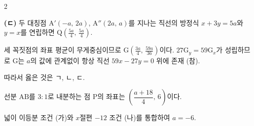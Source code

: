 \documentclass[10pt,fleqn]{article}
\renewcommand{\solpart}[1]{%
  \par\addvspace{10pt}\noindent
  {\sffamily\bfseries\color{black}(#1)}\hspace{3mm}\ignorespaces%
}
\begin{document}
\begin{multicols}{2}
\solpart{ㄷ} 두 대칭점 $\mathrm{A}'(-a,\,2a)$, $\mathrm{A}''(2a,\,a)$를 지나는 직선의 방정식 $x + 3y = 5a$와 $y=x$를 연립하면 $\mathrm{Q}\!\left(\tfrac{5a}{4},\,\tfrac{5a}{4}\right)$.

세 꼭짓점의 좌표 평균이 무게중심이므로 $\mathrm{G}\!\left(\tfrac{3a}{4},\,\tfrac{59a}{36}\right)$이다. $27\mathrm{G}_y = 59\mathrm{G}_x$가 성립하므로 $\mathrm{G}$는 $a$의 값에 관계없이 항상 직선 $59x - 27y = 0$ 위에 존재 (참).

따라서 옳은 것은 ㄱ, ㄴ, ㄷ.


선분 $\mathrm{AB}$를 $3:1$로 내분하는 점 $\mathrm{P}$의 좌표는 $\left(\dfrac{a+18}{4},\,6\right)$이다.

넓이 이등분 조건 (가)와 $x$절편 $-12$ 조건 (나)를 통합하여 $a = -6$.

\end{multicols}

\clearpage
\end{document}
